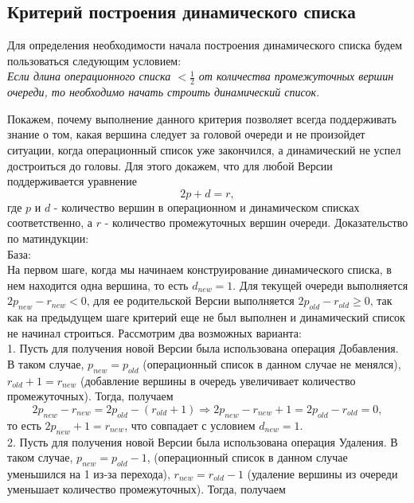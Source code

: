 \documentclass[a4paper,12pt]{extarticle}
\begin{document}
\subsection{Критерий построения динамического списка}
Для определения необходимости начала построения динамического списка будем пользоваться следующим условием:\\
\emph{Если длина операционного списка $< \frac{1}{2}$ от количества промежуточных вершин очереди, то необходимо начать строить динамический список.}\par
Покажем, почему выполнение данного критерия позволяет всегда поддерживать знание о том, какая вершина следует за головой очереди и не произойдет ситуации, когда операционный список уже закончился, а динамический не успел достроиться до головы. Для этого докажем, что для любой Версии поддерживается уравнение
\begin{equation}
    \label{equ}
        2p + d = r,
\end{equation}
где $p$ и $d$ - количество вершин в операционном и динамическом списках соответственно, а $r$ - количество промежуточных вершин очереди. Доказательство по матиндукции:\\
База:\\
На первом шаге, когда мы начинаем конструирование динамического списка, в нем находится одна вершина, то есть $d_{new} = 1$. Для текущей очереди выполняется $2p_{new} - r_{new} < 0$, для ее родительской Версии выполняется $2p_{old} - r_{old} \geqslant 0$, так как на предыдущем шаге критерий еще не был выполнен и динамический список не начинал строиться. Рассмотрим два возможных варианта:\\
1. Пусть для получения новой Версии была использована операция Добавления. В таком случае, $p_{new} = p_{old}$ (операционный список в данном случае не менялся), $r_{old} + 1 = r_{new}$ (добавление вершины в очередь увеличивает количество промежуточных). Тогда, получаем
\begin{equation}
    \nonumber2p_{new} - r_{new} = 2p_{old} - (r_{old} + 1) \Rightarrow 2p_{new} - r_{new} + 1 = 2p_{old} - r_{old} = 0,
\end{equation}
то есть $2p_{new} + 1 = r_{new}$, что совпадает с условием $d_{new} = 1$.\\
2. Пусть для получения новой Версии была использована операция Удаления. В таком случае, $p_{new} = p_{old} - 1$, (операционный список в данном случае уменьшился на 1 из-за перехода), $r_{new} = r_{old} - 1$ (удаление вершины из очереди уменьшает количество промежуточных). Тогда, получаем
\end{document}
